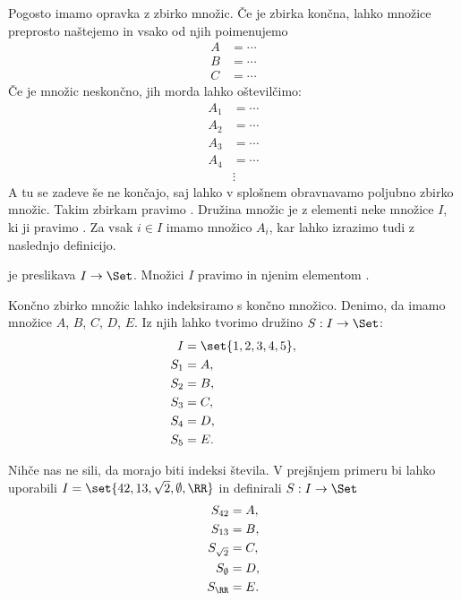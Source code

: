 Pogosto imamo opravka z zbirko množic. Če je zbirka končna, lahko množice preprosto
naštejemo in vsako od njih poimenujemo
%
\begin{align*}
    A &= \cdots \\
    B &= \cdots \\
    C &= \cdots
\end{align*}
%
Če je množic neskončno, jih morda lahko oštevilčimo:
%
\begin{align*}
    A_1 &= \cdots \\
    A_2 &= \cdots \\
    A_3 &= \cdots \\
    A_4 &= \cdots \\
        &\vdots
\end{align*}
%
A tu se zadeve še ne končajo, saj lahko v splošnem obravnavamo poljubno zbirko množic.
Takim zbirkam pravimo . Družina množic je  z elementi neke množice $I$, ki ji pravimo . Za vsak $i \in I$ imamo množico $A_i$,  kar lahko izrazimo tudi z naslednjo definicijo.

\begin{definicija}
   je preslikava $I \to \Set$. Množici $I$ pravimo  in njenim elementom .
\end{definicija}


\begin{zgled}
  Končno zbirko množic lahko indeksiramo s končno množico. Denimo, da imamo
  množice $A$, $B$, $C$, $D$, $E$. Iz njih lahko tvorimo družino $S : I \to \Set$:
  \begin{align*}
  I &= \set{1, 2, 3, 4, 5}, \\
  S_1 &= A,\\
  S_2 &= B,\\
  S_3 &= C,\\
  S_4 &= D,\\
  S_5 &= E.
  \end{align*}
\end{zgled}

\begin{zgled}
  Nihče nas ne sili, da morajo biti indeksi števila. V prejšnjem primeru bi lahko
  uporabili $I = \set{42, 13, \sqrt{2}, \emptyset, \RR}$ in definirali $S : I \to \Set$
  \begin{align*}
  S_{42} &= A,\\
  S_{13} &= B,\\
  S_{\sqrt{2}} &= C,\\
  S_{\emptyset} &= D,\\
  S_{\RR} &= E.
  \end{align*}
\end{zgled}


